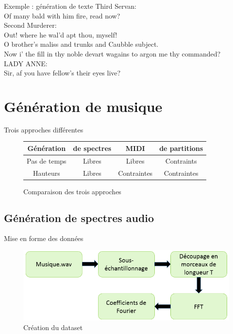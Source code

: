 \documentclass{beamer}
\begin{document}
\begin{frame}{Exemple : génération de texte}
Third Servan:\\
Of many bald with him fire, read now?\\
\medbreak
Second Murderer:\\
Out! where he wal’d apt thou, myself!\\
O brother’s maliss and trunks and Caubble subject.\\
Now i’ the fill in thy noble devart wagains to argon me
thy commanded?\\
\medbreak
LADY ANNE:\\
Sir, af you have fellow’s their eyes live?
\end{frame}

\section{Génération de musique}

\begin{frame}{Trois approches différentes}
\begin{figure}
\begin{center}
\begin{tabular}{|c|c|c|c|}
\hline
\textbf{Génération} & \textbf{de spectres} & \textbf{MIDI} & \textbf{de partitions} \\
\hline
Pas de temps & Libres & Libres & Contraints \\
\hline
Hauteurs & Libres & Contraintes & Contraintes \\
\hline
\end{tabular}
\caption{Comparaison des trois approches}
\end{center}
\end{figure}
\end{frame}

\subsection{Génération de spectres audio}

\begin{frame}{Mise en forme des données}
\begin{figure}
\begin{center}
\includegraphics[scale = 0.57]{images/pipeline.png}
\caption{Création du dataset}
\end{center}
\end{figure}
\end{frame}
\end{document}
